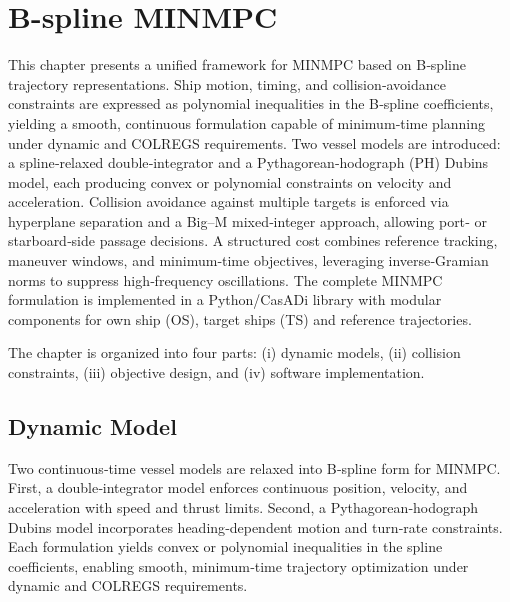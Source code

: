 
\chapter{B-spline MINMPC}\label{chap:b-spline-minmpc}

This chapter presents a unified framework for \acrfull{MINMPC} based on B‐spline trajectory representations. Ship motion, timing, and collision‐avoidance constraints are expressed as polynomial inequalities in the B‐spline coefficients, yielding a smooth, continuous formulation capable of minimum‐time planning under dynamic and COLREGS requirements. Two vessel models are introduced: a spline‐relaxed double‐integrator and a Pythagorean‐hodograph (PH) Dubins model, each producing convex or polynomial constraints on velocity and acceleration. Collision avoidance against multiple targets is enforced via hyperplane separation and a Big–M mixed‐integer approach, allowing port‐ or starboard‐side passage decisions. A structured cost combines reference tracking, maneuver windows, and minimum‐time objectives, leveraging inverse‐Gramian norms to suppress high‐frequency oscillations. The complete MINMPC formulation is implemented in a Python/CasADi library with modular components for own ship (\acrshort{OS}), target ships (\acrshort{TS}) and reference trajectories. 

The chapter is organized into four parts: (i) dynamic models, (ii) collision constraints, (iii) objective design, and (iv) software implementation.


\section{Dynamic Model}

Two continuous‐time vessel models are relaxed into B‐spline form for MINMPC. First, a double‐integrator model enforces continuous position, velocity, and acceleration with speed and thrust limits. Second, a Pythagorean‐hodograph Dubins model incorporates heading‐dependent motion and turn‐rate constraints. Each formulation yields convex or polynomial inequalities in the spline coefficients, enabling smooth, minimum‐time trajectory optimization under dynamic and COLREGS requirements.


